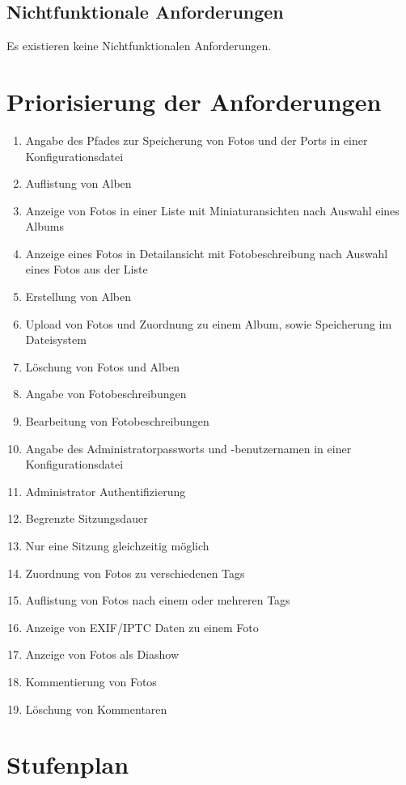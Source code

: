 \documentclass[a4paper,12pt,liststotocnumbered]{scrartcl}
\begin{document}
\subsection{Nichtfunktionale Anforderungen}

Es existieren keine Nichtfunktionalen Anforderungen.

\section{Priorisierung der Anforderungen}

\begin{enumerate}
	\item Angabe des Pfades zur Speicherung von Fotos und der Ports  in
		einer Konfigurationsdatei
	\item Auflistung von Alben
	\item Anzeige von Fotos in einer Liste mit Miniaturansichten nach
		Auswahl eines Albums
	\item Anzeige eines Fotos in Detailansicht mit Fotobeschreibung nach
		Auswahl eines Fotos aus der Liste
	\item Erstellung von Alben
	\item Upload von Fotos und Zuordnung zu einem Album, sowie Speicherung
		im Dateisystem
	\item Löschung von Fotos und Alben
	\item Angabe von Fotobeschreibungen
	\item Bearbeitung von Fotobeschreibungen
	\item Angabe des Administratorpassworts und -benutzernamen in einer
		Konfigurationsdatei
	\item Administrator Authentifizierung
	\item Begrenzte Sitzungsdauer
	\item Nur eine Sitzung gleichzeitig möglich
	\item Zuordnung von Fotos zu verschiedenen Tags
	\item Auflistung von Fotos nach einem oder mehreren Tags
	\item Anzeige von EXIF/IPTC Daten zu einem Foto
	\item Anzeige von Fotos als Diashow
	\item Kommentierung von Fotos
	\item Löschung von Kommentaren
\end{enumerate}

\section{Stufenplan}
\end{document}
